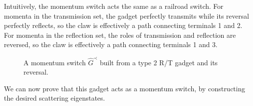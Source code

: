 \documentclass[../thesis-main/thesis-main]{subfiles}
\begin{document}
Intuitively, the momentum switch acts the same as a railroad switch.  For momenta in the transmission set, the gadget perfectly transmits while its reversal perfectly reflects, so the claw is effectively a path connecting terminals 1 and 2.  For momenta in the reflection set, the roles of transmission and reflection are reversed, so the claw is effectively a path connecting terminals 1 and 3.

\begin{figure}
  \centering
  
  \caption[Constructed momentum switch]{A momentum switch $\hat G^\prec$ built from a type 2 R/T gadget and its reversal.}
  \label{fig:gen_mom_con}
\end{figure}

We can now prove that this gadget acts as a momentum switch, by constructing the desired scattering eigenstates.
\end{document}
